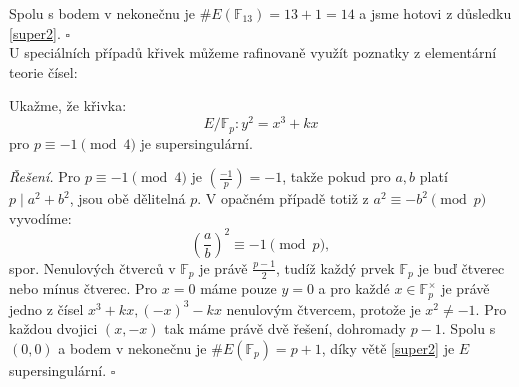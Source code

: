 \documentclass[12pt]{report}
\begin{document}
Spolu s bodem v nekonečnu je $\# E(\mathbb{F}_{13})=13+1=14$ a jsme hotovi z důsledku \ref{super2}. \hfill $\square$\\

U speciálních případů křivek můžeme rafinovaně využít poznatky z elementární teorie čísel:

\begin{priklad}
Ukažme, že křivka:
 $$E/\mathbb{F}_p : y^2 = x^3 + kx$$
pro $ p \equiv -1 \pmod{4}$ je supersingulární.
\end{priklad}
\noindent \textit{Řešení.} Pro $p \equiv -1 \pmod{4}$ je $\genfrac{(}{)}{}{}{-1}{p} = -1$, takže pokud pro $a,b$ platí $p \mid a^2 + b^2$, jsou obě dělitelná $p$. V opačném případě totiž z $a^2 \equiv -b^2 \pmod{p}$ vyvodíme:
\begin{equation*}
\left(\frac{a}{b}\right)^2 \equiv -1 \pmod{p},
\end{equation*} 
spor. Nenulových čtverců v $\mathbb{F}_p$ je právě $\frac{p-1}{2}$, tudíž každý prvek $\mathbb{F}_p$ je buď čtverec nebo mínus čtverec. Pro $x= 0$ máme pouze $y = 0$ a pro každé $x \in \mathbb{F}_p^{\times}$ je právě jedno z čísel $x^3+kx, (-x)^3-kx$ nenulovým čtvercem, protože je $x^2 \neq -1$. Pro každou dvojici $(x,-x)$ tak máme právě dvě řešení, dohromady $p-1$. Spolu s $(0,0)$ a bodem v nekonečnu je $\# E(\mathbb{F}_p) = p+1$, díky větě \ref{super2} je $E$ supersingulární. \hfill $\square$\\
\end{document}
